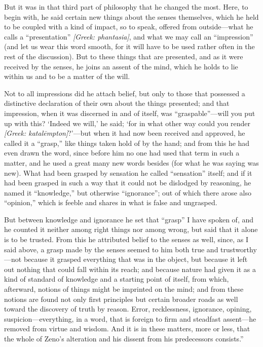  But it was in that third part of philosophy that he changed the most. Here, to begin with, he said certain new things about the senses themselves, which he held to be coupled with a kind of impact, so to speak, offered from outside—what he calls a ``presentation'' \textit{[Greek: phantasia]}, and what we may call an ``impression'' (and let us wear this word smooth, for it will have to be used rather often in the rest of the discussion). But to these things that are presented, and as it were received by the senses, he joins an assent of the mind, which he holds to lie within us and to be a matter of the will.

 Not to all impressions did he attach belief, but only to those that possessed a distinctive declaration of their own about the things presented; and that impression, when it was discerned in and of itself, was ``graspable''—will you put up with this? `Indeed we will,' he said; `for in what other way could you render \textit{[Greek: katalēmpton]}?'—but when it had now been received and approved, he called it a ``grasp,'' like things taken hold of by the hand; and from this he had even drawn the word, since before him no one had used that term in such a matter, and he used a great many new words besides (for what he was saying was new). What had been grasped by sensation he called ``sensation'' itself; and if it had been grasped in such a way that it could not be dislodged by reasoning, he named it ``knowledge,'' but otherwise ``ignorance''; out of which there arose also ``opinion,'' which is feeble and shares in what is false and ungrasped.

 But between knowledge and ignorance he set that ``grasp'' I have spoken of, and he counted it neither among right things nor among wrong, but said that it alone is to be trusted. From this he attributed belief to the senses as well, since, as I said above, a grasp made by the senses seemed to him both true and trustworthy—not because it grasped everything that was in the object, but because it left out nothing that could fall within its reach; and because nature had given it as a kind of standard of knowledge and a starting point of itself, from which, afterward, notions of things might be imprinted on the mind; and from these notions are found not only first principles but certain broader roads as well toward the discovery of truth by reason. Error, recklessness, ignorance, opining, suspicion—everything, in a word, that is foreign to firm and steadfast assent—he removed from virtue and wisdom. And it is in these matters, more or less, that the whole of Zeno's alteration and his dissent from his predecessors consists.''

